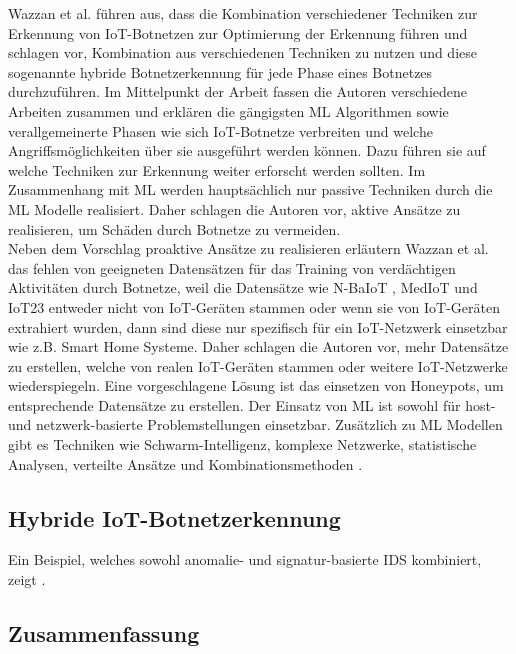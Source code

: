 Wazzan et al. \cite{Wazzan2021InternetOT} führen aus, dass die Kombination 
verschiedener Techniken zur Erkennung von IoT-Botnetzen zur Optimierung der Erkennung führen und schlagen 
vor, Kombination aus verschiedenen Techniken zu nutzen und diese sogenannte hybride Botnetzerkennung für 
jede Phase eines Botnetzes durchzuführen. Im Mittelpunkt der Arbeit fassen die Autoren verschiedene Arbeiten zusammen und erklären die gängigsten ML Algorithmen sowie verallgemeinerte Phasen wie sich IoT-Botnetze verbreiten und welche 
Angriffsmöglichkeiten über sie ausgeführt werden können. Dazu führen sie auf welche Techniken zur Erkennung weiter erforscht werden sollten. Im Zusammenhang mit ML werden hauptsächlich nur passive Techniken durch die ML Modelle realisiert. Daher schlagen die Autoren vor, aktive Ansätze zu realisieren, um Schäden durch Botnetze zu vermeiden. \\[0.2in]

Neben dem Vorschlag proaktive Ansätze zu realisieren erläutern Wazzan et al. das fehlen von geeigneten Datensätzen für das Training von verdächtigen Aktivitäten durch Botnetze, weil die Datensätze wie N-BaIoT \cite{DBLP:journals/pervasive/MeidanBMMSBE18}, MedIoT \cite{DBLP:conf/icissp/Guerra-Manzanares20} und IoT23 \cite{sebastian_garcia_2020_4743746} entweder nicht von IoT-Geräten stammen oder wenn sie von IoT-Geräten extrahiert wurden, dann sind diese nur spezifisch für ein IoT-Netzwerk einsetzbar wie z.B. Smart Home Systeme. Daher schlagen die Autoren vor, mehr Datensätze zu erstellen, welche von realen IoT-Geräten stammen oder weitere IoT-Netzwerke wiederspiegeln. Eine vorgeschlagene Lösung ist das einsetzen von Honeypots, um entsprechende Datensätze zu erstellen. Der Einsatz von ML ist sowohl für host- und netzwerk-basierte Problemstellungen einsetzbar. Zusätzlich zu ML Modellen gibt es Techniken wie Schwarm-Intelligenz, komplexe Netzwerke, statistische Analysen, verteilte Ansätze und Kombinationsmethoden \cite{Xing2021SurveyOB}.

\subsection{Hybride IoT-Botnetzerkennung}

Ein Beispiel, welches sowohl anomalie- und signatur-basierte IDS kombiniert, zeigt \cite{electronics8111210}. 

\subsection{Zusammenfassung}


